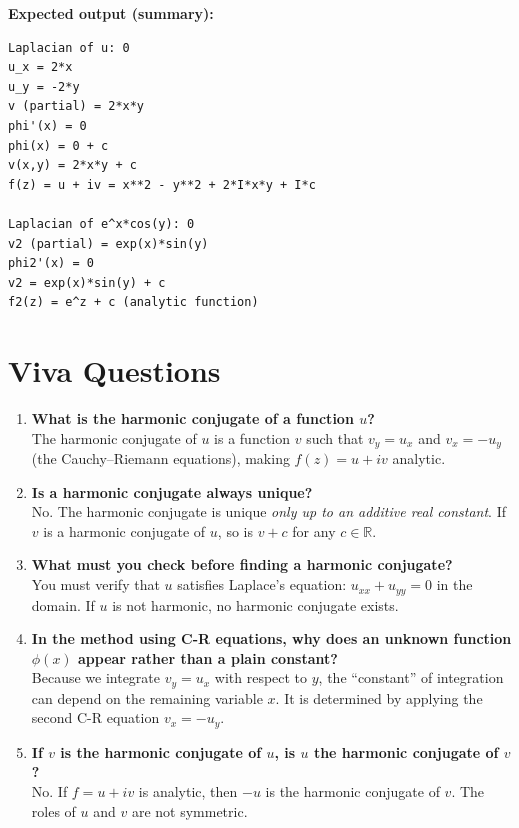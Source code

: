 \documentclass[12pt,a4paper]{article}
\begin{document}
\textbf{Expected output (summary):}
\begin{verbatim}
Laplacian of u: 0
u_x = 2*x
u_y = -2*y
v (partial) = 2*x*y
phi'(x) = 0
phi(x) = 0 + c
v(x,y) = 2*x*y + c
f(z) = u + iv = x**2 - y**2 + 2*I*x*y + I*c

Laplacian of e^x*cos(y): 0
v2 (partial) = exp(x)*sin(y)
phi2'(x) = 0
v2 = exp(x)*sin(y) + c
f2(z) = e^z + c (analytic function)
\end{verbatim}

\section{Viva Questions}

\begin{enumerate}[label=\textbf{Q\arabic*.}]

\item \textbf{What is the harmonic conjugate of a function $u$?}\\
      The harmonic conjugate of $u$ is a function $v$ such that $v_y=u_x$ and $v_x=-u_y$
      (the Cauchy--Riemann equations), making $f(z)=u+iv$ analytic.

\item \textbf{Is a harmonic conjugate always unique?}\\
      No. The harmonic conjugate is unique \emph{only up to an additive real constant}.
      If $v$ is a harmonic conjugate of $u$, so is $v+c$ for any $c\in\mathbb{R}$.

\item \textbf{What must you check before finding a harmonic conjugate?}\\
      You must verify that $u$ satisfies Laplace's equation: $u_{xx}+u_{yy}=0$ in the
      domain. If $u$ is not harmonic, no harmonic conjugate exists.

\item \textbf{In the method using C-R equations, why does an unknown function $\phi(x)$
      appear rather than a plain constant?}\\
      Because we integrate $v_y=u_x$ with respect to $y$, the ``constant'' of integration
      can depend on the remaining variable $x$. It is determined by applying the second
      C-R equation $v_x=-u_y$.

\item \textbf{If $v$ is the harmonic conjugate of $u$, is $u$ the harmonic conjugate of
      $v$?}\\
      No. If $f=u+iv$ is analytic, then $-u$ is the harmonic conjugate of $v$. The roles
      of $u$ and $v$ are not symmetric.


\end{enumerate}
\end{document}

